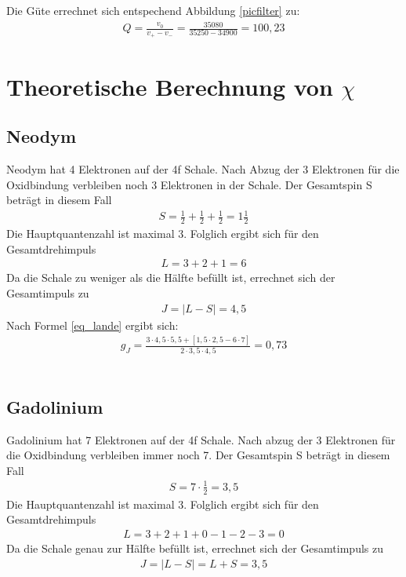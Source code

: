 Die Güte errechnet sich entspechend Abbildung \ref{picfilter} zu:
\begin{align*}
Q=\frac{v_0}{v_+ - v_-}=\frac{35080}{35250-34900}=100,23
\end{align*}

\section{Theoretische Berechnung von $\chi$}
\subsection{Neodym }
Neodym hat 4 Elektronen auf der 4f Schale. Nach Abzug der 3 Elektronen für die Oxidbindung verbleiben noch 3 Elektronen in der Schale. Der Gesamtspin S beträgt in diesem Fall 
\begin{align*}
S=\frac{1}{2}+ \frac{1}{2}+ \frac{1}{2} = 1 \frac{1}{2}
\end{align*}
Die Hauptquantenzahl ist maximal 3. Folglich ergibt sich für den Gesamtdrehimpuls \begin{align*}
L=3+2+1=6
\end{align*}
Da die Schale zu weniger als die Hälfte befüllt ist, errechnet sich der Gesamtimpuls zu 
\begin{align*}
J=|L-S|=4,5
\end{align*}
Nach Formel \eqref{eq_lande} ergibt sich:
\begin{align}
g_J=\frac{3\cdot4,5\cdot5,5+[1,5\cdot2,5-6\cdot7]}{2\cdot 3,5\cdot4,5}=0,73
\end{align}\\

\subsection{Gadolinium }
Gadolinium hat 7 Elektronen auf der 4f Schale. Nach abzug der 3 Elektronen für die Oxidbindung verbleiben immer noch 7. Der Gesamtspin S beträgt in diesem Fall \begin{align*}
S=7\cdot\frac{1}{2} = 3,5
\end{align*}
Die Hauptquantenzahl ist maximal 3. Folglich ergibt sich für den Gesamtdrehimpuls
\begin{align*}
L=3+2+1+0-1-2-3=0
\end{align*}
Da die Schale genau zur Hälfte befüllt ist, errechnet sich der Gesamtimpuls zu 
\begin{align*}
J=|L-S|=L+S=3,5
\end{align*}

